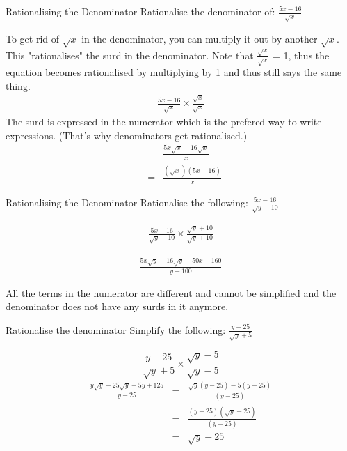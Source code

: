 \begin{wex}{Rationalising the Denominator}
{Rationalise the denominator of: $\frac{5x - 16}{\sqrt{x}}$}{

To get rid of $\sqrt{x}$ in the denominator, you can multiply it out by another $\sqrt{x}$. This "rationalises" the surd in the denominator. Note that $\frac{\sqrt{x}}{\sqrt{x}}$ = 1, thus the equation becomes rationalised by multiplying by 1 and thus still says the same thing.
    \begin{eqnarray*}
\frac{5x - 16}{\sqrt{x}} \times \frac{\sqrt{x}}{\sqrt{x}}
\end{eqnarray*}
The surd is expressed in the numerator which is the prefered way to write expressions. (That's why denominators get rationalised.)
\begin{eqnarray*}
 & &\frac{5x\sqrt{x} - 16\sqrt{x}}{x}\\
 & = &\frac{(\sqrt{x})(5x - 16)}{x}
\end{eqnarray*}
}
\end{wex}

\begin{wex}{Rationalising the Denominator} 
{Rationalise the following: $\frac{5x - 16}{\sqrt{y} - 10}$}{
\begin{eqnarray*}
\frac{5x - 16}{\sqrt{y} - 10} \times \frac{\sqrt{y} + 10}{\sqrt{y} + 10}
\end{eqnarray*}
    
\begin{eqnarray*}
\frac{5x\sqrt{y} - 16\sqrt{y} + 50x - 160}{y - 100}
\end{eqnarray*}
    
All the terms in the numerator are different and cannot be simplified and the denominator does not have any surds in it anymore.}
\end{wex}

\begin{wex}{Rationalise the denominator}
{Simplify the following: $\frac{y-25}{\sqrt{y} + 5}$}{

    \begin{equation*}
\frac{y-25}{\sqrt{y} + 5} \times \frac{\sqrt{y} - 5}{\sqrt{y} - 5}
\end{equation*}
    \begin{eqnarray*}
\frac{y\sqrt{y} - 25\sqrt{y} - 5y + 125}{y - 25} &=& \frac{\sqrt{y}(y - 25) - 5(y-25)}{(y-25)}\\
&=& \frac{(y-25)(\sqrt{y} - 25)}{(y - 25)}\\
&=& \sqrt{y} - 25
\end{eqnarray*}
}
\end{wex}

